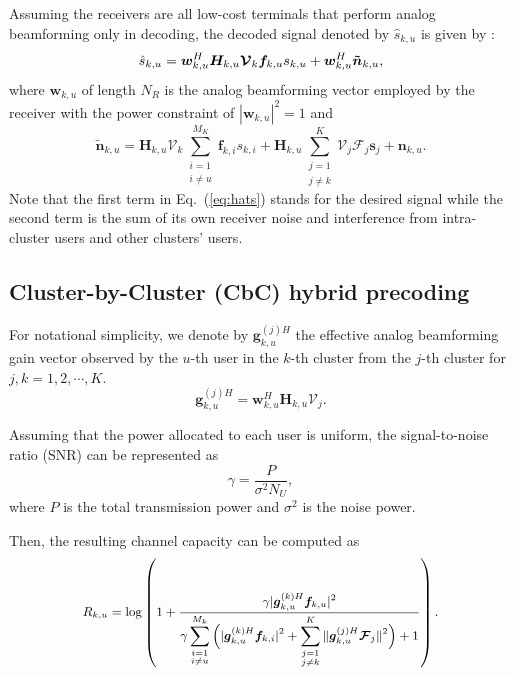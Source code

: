 \documentclass[conference]{IEEEtran}
\begin{document}
{Assuming the receivers are all low-cost terminals that perform analog beamforming only in decoding, the decoded signal denoted by $\hat{s}_{k,u}$ is given by :
\begin{equation}{\label{eq:hats}}
\hat{s}_{k,u} = \bm{w}_{k,u}^H \bm{H}_{k,u} \bm{\mathcal{V}}_k \bm{f}_{k,u} s_{k,u} + \bm{w}_{k,u}^H \bm{\tilde{n}}_{k,u},
\end{equation}
where ${\bm w}_{k,u}$ of length $N_R$ is the analog beamforming vector employed by the receiver with the power constraint of $|\bm{w}_{k,u}|^2=1$ and
\begin{equation}\label{Eq:ntilde}
\bm{\tilde{n}}_{k,u}=\bm{H}_{k,u} \bm{\mathcal{V}}_k\sum_{\substack{i=1 \\ i\neq u}}^{M_K}\bm{f}_{k,i}s_{k,i} + \bm{H}_{k,u}\sum_{\substack{j=1\\j\neq k}}^{K}\bm{\mathcal{V}}_j\bm{\mathcal{F}}_j\bm{s}_j+  \bm{n}_{k,u}.
\end{equation}
Note that the first term in Eq.~(\ref{eq:hats}) stands for the desired signal while the second term is the sum of its own receiver noise and interference from intra-cluster users and other clusters' users.

\subsection{Cluster-by-Cluster (CbC) hybrid precoding}
For notational simplicity, we denote by ${\bm{g}}^{(j)H}_{k,u}$ the effective analog beamforming gain vector observed by the $u$-th user in the $k$-th cluster from the $j$-th cluster for $j,k=1,2,\cdots,K$.
\begin{equation}\label{eq:def}
{\bm{g}}^{(j)H}_{k,u} = \bm{w}^H_{k,u} \bm{H}_{k,u} \bm{\mathcal{V}}_{j}.
\end{equation}

Assuming that the power allocated to each user is uniform, the signal-to-noise ratio (SNR) can be represented as
\begin{equation}
\gamma = \frac{P}{\sigma^2N_U},\label{eq:gamma}
\end{equation}
where $P$ is the total transmission power and $\sigma^2$ is the noise power.

Then, the resulting channel capacity can be computed as
\begin{equation}\small\label{eq:convenR}
R_{k,u} = \log\left(1+\frac{\gamma|{\bm{g}}_{k,u}^{(k)H} \bm{f}_{k,u}|^2}{\gamma\displaystyle\sum_{\substack{i=1 \\ i\neq u}}^{M_k}\Big(|{\bm{g}}_{k,u}^{(k)H}\bm{f}_{k,i}|^2+\displaystyle\sum_{\substack{j=1\\j\neq k}}^{K}\|\bm{g}_{k,u}^{(j)H}\bm{\mathcal{F}}_j\|^2\Big)+1}\right).
\end{equation}

}
\end{document}
